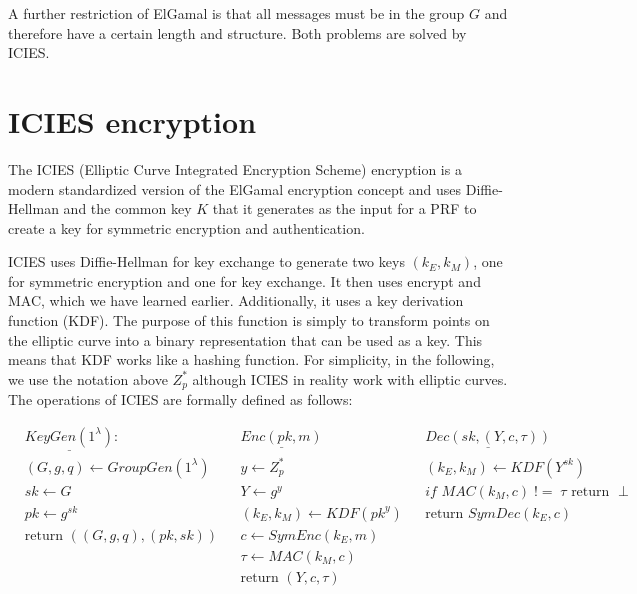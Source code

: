 A further restriction of ElGamal is that all messages must be in the group $G$ and therefore have a certain length and structure.
Both problems are solved by ICIES.

\section{ICIES encryption}\label{sec:ICIES}


The ICIES (Elliptic Curve Integrated Encryption Scheme) encryption is a modern standardized version of the ElGamal encryption concept and uses Diffie-Hellman and the common key $K$ that it generates as the input for a PRF to create a key for symmetric encryption and authentication.

ICIES uses Diffie-Hellman for key exchange to generate two keys $(k_E, k_M)$, one for symmetric encryption and one for key exchange.
It then uses encrypt and MAC, which we have learned earlier.
Additionally, it uses a key derivation function (KDF).
The purpose of this function is simply to transform points on the elliptic curve into a binary representation that can be used as a key.
This means that KDF works like a hashing function.
For simplicity, in the following, we use the notation above $Z_p^*$ although ICIES in reality work with elliptic curves.
The operations of ICIES are formally defined as follows:

\begin{align*}
     & \underline{KeyGen(1^\lambda)}:         &  & \underline{Enc(pk, m)}                 &  & \underline{Dec(sk,(Y,c,\tau))}                              \\
     & (G,g,q) \leftarrow GroupGen(1^\lambda) &  & y             \leftarrow Z_p^*         &  & (k_E,k_M)                            \leftarrow KDF(Y^{sk}) \\
     & sk \leftarrow  G                       &  & Y             \leftarrow g^y           &  & \textit{if } MAC(k_M, c) \;!=\; \tau  \text{ return } \perp \\
     & pk  \leftarrow g^{sk}                  &  & (k_E, k_M)    \leftarrow KDF(pk^y)     &  & \text{return } SymDec(k_E,c)                                \\
     & \text{return } ((G,g,q), (pk,sk))      &  & c             \leftarrow SymEnc(k_E,m) &  &                                                             \\
     &                                        &  & \tau          \leftarrow MAC(k_M,c)    &  &                                                             \\
     &                                        &  & \text{return }(Y,c,\tau)               &  &                                                             \\
\end{align*}


